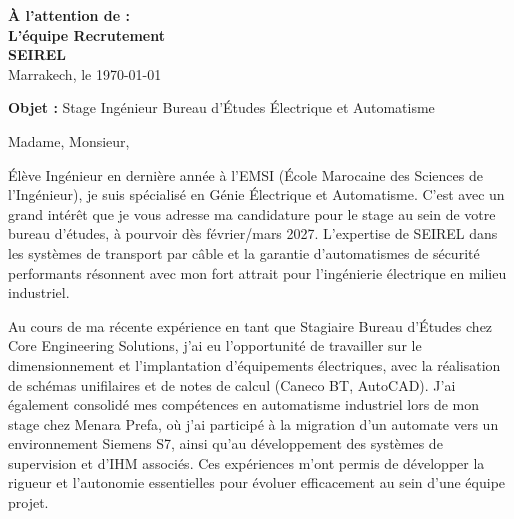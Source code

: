 \documentclass[10pt,a4paper]{../../altacv}
\makeatletter
\renewcommand{\makecvheader}{%
  \begingroup
    \raggedright\color{emphasis}%
    {\Huge\bfseries\MakeUppercase{\@name}\par}
    \medskip
    {\large\bfseries\color{accent}\@tagline\par}
    \medskip
    {\footnotesize\bfseries\@personalinfo\par}
  \endgroup\medskip
}
\makeatother
\begin{document}

\makecvheader

\bigskip
\medskip

\begin{flushright}
  {\color{emphasis}\textbf{À l'attention de :}} \\[2pt]
  \textbf{L'équipe Recrutement} \\
  \textbf{SEIREL} \\[20pt]
  Marrakech, le \today
\end{flushright}
\bigskip

\bigskip

{\color{accent}\textbf{Objet :}} Stage Ingénieur Bureau d'Études Électrique et Automatisme

\bigskip\bigskip

Madame, Monsieur,

\vspace{0.4cm}

Élève Ingénieur en dernière année à l'EMSI (École Marocaine des Sciences de l'Ingénieur), je suis spécialisé en Génie Électrique et Automatisme. C'est avec un grand intérêt que je vous adresse ma candidature pour le stage au sein de votre bureau d'études, à pourvoir dès février/mars 2027. L'expertise de SEIREL dans les systèmes de transport par câble et la garantie d'automatismes de sécurité performants résonnent avec mon fort attrait pour l'ingénierie électrique en milieu industriel.

\vspace{0.4cm}

Au cours de ma récente expérience en tant que Stagiaire Bureau d'Études chez Core Engineering Solutions, j'ai eu l'opportunité de travailler sur le dimensionnement et l'implantation d'équipements électriques, avec la réalisation de schémas unifilaires et de notes de calcul (Caneco BT, AutoCAD). J'ai également consolidé mes compétences en automatisme industriel lors de mon stage chez Menara Prefa, où j'ai participé à la migration d'un automate vers un environnement Siemens S7, ainsi qu'au développement des systèmes de supervision et d'IHM associés. Ces expériences m'ont permis de développer la rigueur et l'autonomie essentielles pour évoluer efficacement au sein d'une équipe projet.
\end{document}
